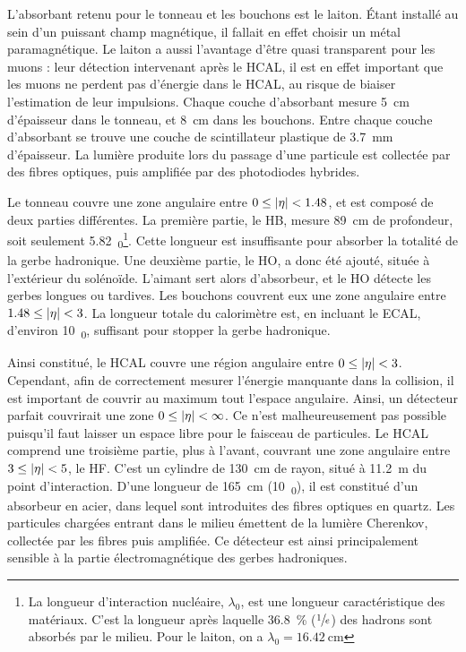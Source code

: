 L'absorbant retenu pour le tonneau et les bouchons est le laiton. Étant installé au sein d'un puissant champ magnétique, il fallait en effet choisir un métal paramagnétique. Le laiton a aussi l'avantage d'être quasi transparent pour les muons : leur détection intervenant après le HCAL, il est en effet important que les muons ne perdent pas d'énergie dans le HCAL, au risque de biaiser l'estimation de leur impulsions. Chaque couche d'absorbant mesure \SI{5}{\cm} d'épaisseur dans le tonneau, et \SI{8}{\cm} dans les bouchons. Entre chaque couche d'absorbant se trouve une couche de scintillateur plastique de \SI{3.7}{\mm} d'épaisseur. La lumière produite lors du passage d'une particule est collectée par des fibres optiques, puis amplifiée par des photodiodes hybrides.

\medskip

Le tonneau couvre une zone angulaire entre $0 \leq \lvert \eta \rvert < \num{1.48}$, et est composé de deux parties différentes. La première partie, le HB, mesure \SI{89}{\cm} de profondeur, soit seulement \SI{5.82}{\lambda_0}\footnote{La longueur d'interaction nucléaire, $\lambda_0$, est une longueur caractéristique des matériaux. C'est la longueur après laquelle \SI{36.8}{\%} ($\sfrac{1}{e}$) des hadrons sont absorbés par le milieu. Pour le laiton, on a $\lambda_0 = \SI{16.42}{\cm}$}. Cette longueur est insuffisante pour absorber la totalité de la gerbe hadronique. Une deuxième partie, le HO, a donc été ajouté, située à l'extérieur du solénoïde. L'aimant sert alors d'absorbeur, et le HO détecte les gerbes longues ou tardives. Les bouchons couvrent eux une zone angulaire entre $1.48 \leq \lvert \eta \rvert < \num{3}$. La longueur totale du calorimètre est, en incluant le ECAL, d'environ \SI{10}{\lambda_0}, suffisant pour stopper la gerbe hadronique.

\bigskip

Ainsi constitué, le HCAL couvre une région angulaire entre $0 \leq \lvert \eta \rvert < \num{3}$. Cependant, afin de correctement mesurer l'énergie manquante dans la collision, il est important de couvrir au maximum tout l'espace angulaire. Ainsi, un détecteur parfait couvrirait une zone $0 \leq \lvert \eta \rvert < \infty$. Ce n'est malheureusement pas possible puisqu'il faut laisser un espace libre pour le faisceau de particules. Le HCAL comprend une troisième partie, plus à l'avant, couvrant une zone angulaire entre $\num{3} \leq \lvert \eta \rvert < \num{5}$, le HF. C'est un cylindre de \SI{130}{\cm} de rayon, situé à \SI{11.2}{\m} du point d'interaction. D'une longueur de \SI{165}{\cm} (\tilde \SI{10}{\lambda_0}), il est constitué d'un absorbeur en acier, dans lequel sont introduites des fibres optiques en quartz. Les particules chargées entrant dans le milieu émettent de la lumière Cherenkov, collectée par les fibres puis amplifiée. Ce détecteur est ainsi principalement sensible à la partie électromagnétique des gerbes hadroniques.

